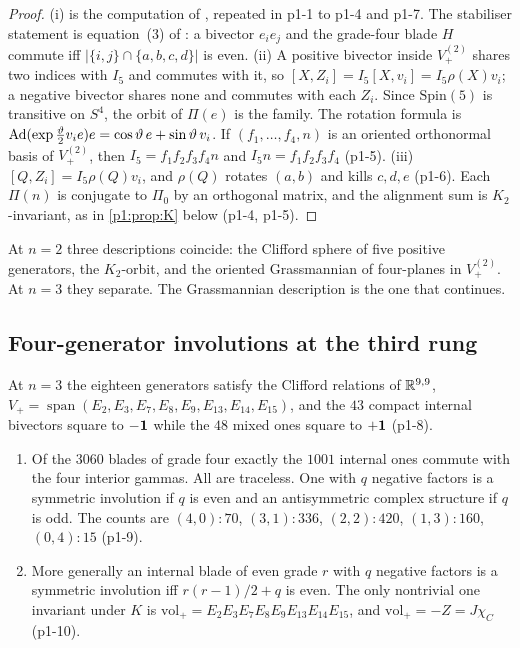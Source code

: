 \begin{proof}
(i) is the computation of \cite[Section~26]{ES17}, repeated in p1-1 to p1-4 and p1-7. The stabiliser statement is equation~(3) of
\cite{ES17}: a bivector $e_ie_j$ and the grade-four blade $H$ commute iff $|\{i,j\}\cap\{a,b,c,d\}|$ is even. (ii) A positive bivector inside $V_+^{(2)}$ shares two
indices with $I_5$ and commutes with it, so $[X,Z_i]=I_5[X,v_i]=I_5\rho(X)v_i$; a negative bivector shares none and commutes with each $Z_i$. Since $\mathrm{Spin}(5)$ is
transitive on $S^4$, the orbit of $\Pi(e)$ is the family. The rotation formula is $\operatorname{Ad}(\exp\tfrac\vartheta2v_ie)e=\cos\vartheta\,e+\sin\vartheta\,v_i$.
If $(f_1,\dots,f_4,n)$ is an oriented orthonormal basis of $V_+^{(2)}$, then $I_5=f_1f_2f_3f_4n$ and $I_5n=f_1f_2f_3f_4$ (p1-5). (iii) $[Q,Z_i]=I_5\rho(Q)v_i$, and
$\rho(Q)$ rotates $(a,b)$ and kills $c,d,e$ (p1-6). Each $\Pi(n)$ is conjugate to $\Pi_0$ by an orthogonal matrix, and the alignment sum is $K_2$-invariant, as in
\cref{p1:prop:K} below (p1-4, p1-5).
\end{proof}

At $n=2$ three descriptions coincide: the Clifford sphere of five positive generators, the $K_2$-orbit, and the oriented Grassmannian of four-planes in
$V_+^{(2)}$. At $n=3$ they separate. The Grassmannian description is the one that continues.

\subsection{Four-generator involutions at the third rung}
\label{p1:sec:classify}

\begin{lemma}
\label{p1:lem:census}
At $n=3$ the eighteen generators satisfy the Clifford relations of $\mathbb{R}^{9,9}$, $V_+=\operatorname{span}(E_2,E_3,E_7,E_8,E_9,E_{13},E_{14},E_{15})$, and the $43$ compact
internal bivectors square to $-\mathbf 1$ while the $48$ mixed ones square to $+\mathbf 1$ (p1-8).
\begin{enumerate}[label=(\roman*),leftmargin=2.2em]
\item Of the $3060$ blades of grade four exactly the $1001$ internal ones commute with the four interior gammas. All are traceless. One with $q$ negative factors is
a symmetric involution if $q$ is even and an antisymmetric complex structure if $q$ is odd. The counts are $(4,0):70$, $(3,1):336$, $(2,2):420$, $(1,3):160$, $(0,4):15$
(p1-9).
\item More generally an internal blade of even grade $r$ with $q$ negative factors is a symmetric involution iff $r(r-1)/2+q$ is even. The only nontrivial one invariant
under $K$ is $\mathrm{vol}_+=E_2E_3E_7E_8E_9E_{13}E_{14}E_{15}$, and $\mathrm{vol}_+=-Z=J\chi_C$ (p1-10).
\end{enumerate}
\end{lemma}

